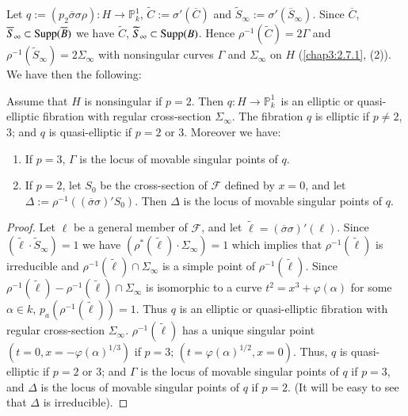 \subsubsection{}\label{chap3:2.7.2}
Let $q:=(p_{2}\overline{\sigma}\sigma\rho):H\to \mathbb{P}^{1}_{k}$,
$\widetilde{C}:=\sigma'(\overline{C})$ and
$\widetilde{S}_{\infty}:=\sigma'(\overline{S}_{\infty})$. Since
$\overline{C}$, $\overline{S}_{\infty}\subset \operatorname{Supp}(\overline{B})$ we
have $\widetilde{C}$, $\widetilde{S}_{\infty}\subset \operatorname{Supp}(B)$. Hence
$\rho^{-1}(\widetilde{C})=2\Gamma$ and
$\rho^{-1}(\widetilde{S}_{\infty})=2\Sigma_{\infty}$ with nonsingular
curves $\Gamma$ and $\Sigma_{\infty}$ on $H$ (\cf \ref{chap3:2.7.1},
(2)). We have then the following:

\begin{lemma*}
Assume that $H$ is nonsingular if $p=2$. Then $q:H\to
\mathbb{P}^{1}_{k}$\pageoriginale\ is an elliptic or quasi-elliptic
fibration with regular cross-section $\Sigma_{\infty}$. The fibration
$q$ is elliptic if $p\neq 2$, $3$; and $q$ is quasi-elliptic if $p=2$
or $3$. Moreover we have:
\begin{enumerate}
\renewcommand{\labelenumi}{\rm(\theenumi)}
\item If $p=3$, $\Gamma$ is the locus of movable singular points of
  $q$.

\item If $p=2$, let $S_{0}$ be the cross-section of $\mathscr{F}$
  defined by $x=0$, and let
  $\Delta:=\rho^{-1}((\overline{\sigma}\sigma)'S_{0})$. Then $\Delta$
  is the locus of movable singular points of $q$.
\end{enumerate}
\end{lemma*}

\begin{proof}
Let $\ell$ be a general member of $\mathscr{F}$, and let
$\widetilde{\ell}=(\overline{\sigma}\sigma)'(\ell)$. Since
$(\widetilde{\ell}\cdot \widetilde{S}_{\infty})=1$ we have
$(\rho^{\ast}(\widetilde{\ell})\cdot \Sigma_{\infty})=1$ which implies
that $\rho^{-1}(\widetilde{\ell})$ is irreducible and
$\rho^{-1}(\widetilde{\ell})\cap \Sigma_{\infty}$ is a simple point of
$\rho^{-1}(\widetilde{\ell})$. Since
$\rho^{-1}(\widetilde{\ell})-\rho^{-1}(\widetilde{\ell})\cap
\Sigma_{\infty}$ is isomorphic to a curve
$t^{2}=x^{3}+\varphi(\alpha)$ for some $\alpha\in k$,
$p_{a}(\rho^{-1}(\widetilde{\ell}))=1$. Thus $q$ is an elliptic or
quasi-elliptic fibration with regular cross-section
$\Sigma_{\infty}$. $\rho^{-1}(\widetilde{\ell})$ has a unique singular
point $(t=0,x=-\varphi(\alpha)^{1/3})$ if $p=3$;
$(t=\varphi(\alpha)^{1/2},x=0)$. Thus, $q$ is quasi-elliptic if $p=2$
or $3$; and $\Gamma$ is the locus of movable singular points of $q$ if
$p=3$, and $\Delta$ is the locus of movable singular points of $q$ if
$p=2$. (It will be easy to see that $\Delta$ is irreducible).
\end{proof}

